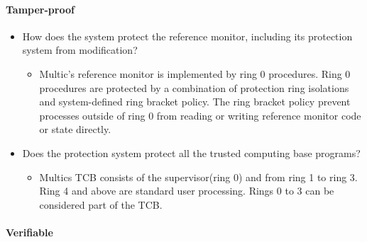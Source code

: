 \documentclass[
  12pt]{findlay}
\providecommand{\tightlist}{%
  \setlength{\itemsep}{0pt}\setlength{\parskip}{0pt}}
\begin{document}
\hypertarget{tamper-proof-1}{%
\paragraph{Tamper-proof}\label{tamper-proof-1}}

\begin{itemize}
\tightlist
\item
  How does the system protect the reference monitor, including its
  protection system from modification?

  \begin{itemize}
  \tightlist
  \item
    Multic's reference monitor is implemented by ring 0 procedures. Ring
    0 procedures are protected by a combination of protection ring
    isolations and system-defined ring bracket policy. The ring bracket
    policy prevent processes outside of ring 0 from reading or writing
    reference monitor code or state directly.
  \end{itemize}
\item
  Does the protection system protect all the trusted computing base
  programs?

  \begin{itemize}
  \tightlist
  \item
    Multics TCB consists of the supervisor(ring 0) and from ring 1 to
    ring 3. Ring 4 and above are standard user processing. Rings 0 to 3
    can be considered part of the TCB.
  \end{itemize}
\end{itemize}

\hypertarget{verifiable-1}{%
\paragraph{Verifiable}\label{verifiable-1}}
\end{document}
